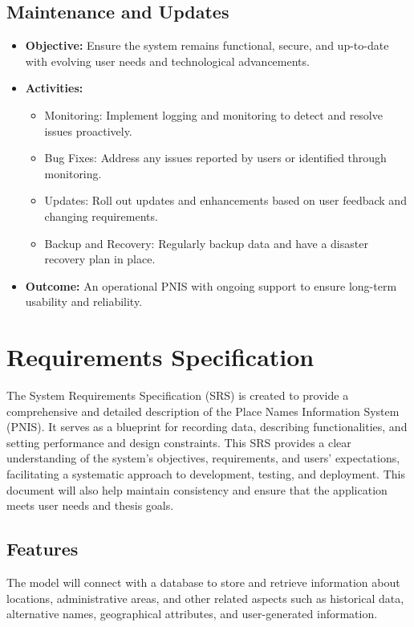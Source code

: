 \subsection{Maintenance and Updates}
\begin{itemize}
    \item \textbf{Objective:} Ensure the system remains functional, secure, and up-to-date with evolving user needs and technological advancements.
    \item \textbf{Activities:}
        \begin{itemize}
            \item Monitoring: Implement logging and monitoring to detect and resolve issues proactively.
            \item Bug Fixes: Address any issues reported by users or identified through monitoring.
            \item Updates: Roll out updates and enhancements based on user feedback and changing requirements.
            \item Backup and Recovery: Regularly backup data and have a disaster recovery plan in place.
        \end{itemize}
    \item \textbf{Outcome:} An operational PNIS with ongoing support to ensure long-term usability and reliability.
\end{itemize}

\section{Requirements Specification}
The System Requirements Specification (SRS) is created to provide a comprehensive and detailed description of the Place Names Information System (PNIS). It serves as a blueprint for recording data, describing functionalities, and setting performance and design constraints. This SRS provides a clear understanding of the system's objectives, requirements, and users' expectations, facilitating a systematic approach to development, testing, and deployment. This document will also help maintain consistency and ensure that the application meets user needs and thesis goals.

\subsection{Features}
The model will connect with a database to store and retrieve information about locations, administrative areas, and other related aspects such as historical data, alternative names, geographical attributes, and user-generated information.

